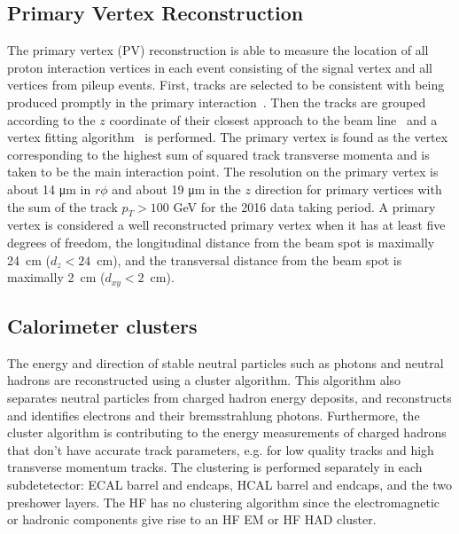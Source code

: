 \subsection{Primary Vertex Reconstruction}
The primary vertex (PV) reconstruction is able to measure the location of all proton interaction vertices in each event consisting of the signal vertex and all vertices from pileup events. First, tracks are selected  to be consistent with being produced promptly in the primary interaction~\cite{Chatrchyan:1704291}. Then the tracks are grouped according to the $z$ coordinate of their closest approach to the beam line~\cite{726788} and a vertex fitting algorithm~\cite{Waltenberger:1166320} is performed. The primary vertex is found as the vertex corresponding to the highest sum of squared track transverse momenta and is taken to be the main interaction point. The resolution on the primary vertex is about 14 \si{ \micro \meter} in $r\phi$ and about 19 \si{ \micro \meter} in the $z$ direction for primary vertices with the sum of the track $p_T > 100$ \si{ \GeV} for the 2016 data taking period. A primary vertex is considered a well reconstructed primary vertex when it has at least five degrees of freedom, the longitudinal distance from the beam spot is maximally 24~cm ($d_z < 24$~cm), and the transversal distance from the beam spot is maximally 2~cm ($d_{xy}<2$~cm). 

\subsection{Calorimeter clusters}
\label{sec:calo}
The energy and direction of stable neutral particles such as photons and neutral hadrons are reconstructed using a cluster algorithm.  This algorithm also separates neutral particles from charged hadron energy deposits, 
and reconstructs and identifies electrons and their bremsstrahlung photons. Furthermore, the cluster algorithm is contributing to the energy measurements of charged hadrons that don't have accurate track parameters, e.g. for low quality tracks and high transverse momentum tracks. The clustering is performed separately in each subdetetector: ECAL barrel and endcaps, HCAL barrel and endcaps, and the two preshower layers. The HF has no clustering algorithm since the electromagnetic or hadronic components give rise to an HF EM or HF HAD cluster. 

